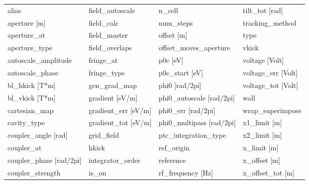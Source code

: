  \begin{tabular}{llll} \toprule
alias                            & field_autoscale                  & n_cell                           & tilt_tot [rad]                   \\
aperture [m]                     & field_calc                       & num_steps                        & tracking_method                  \\
aperture_at                      & field_master                     & offset [m]                       & type                             \\
aperture_type                    & field_overlaps                   & offset_moves_aperture            & vkick                            \\
autoscale_amplitude              & fringe_at                        & p0c [eV]                         & voltage [Volt]                   \\
autoscale_phase                  & fringe_type                      & p0c_start [eV]                   & voltage_err [Volt]               \\
bl_hkick [T*m]                   & gen_grad_map                     & phi0 [rad/2pi]                   & voltage_tot [Volt]               \\
bl_vkick [T*m]                   & gradient [eV/m]                  & phi0_autoscale [rad/2pi]         & wall                             \\
cartesian_map                    & gradient_err [eV/m]              & phi0_err [rad/2pi]               & wrap_superimpose                 \\
cavity_type                      & gradient_tot [eV/m]              & phi0_multipass [rad/2pi]         & x1_limit [m]                     \\
coupler_angle [rad]              & grid_field                       & ptc_integration_type             & x2_limit [m]                     \\
coupler_at                       & hkick                            & ref_origin                       & x_limit [m]                      \\
coupler_phase [rad/2pi]          & integrator_order                 & reference                        & x_offset [m]                     \\
coupler_strength                 & is_on                            & rf_frequency [Hz]                & x_offset_tot [m]                 \\

\end{tabular}
